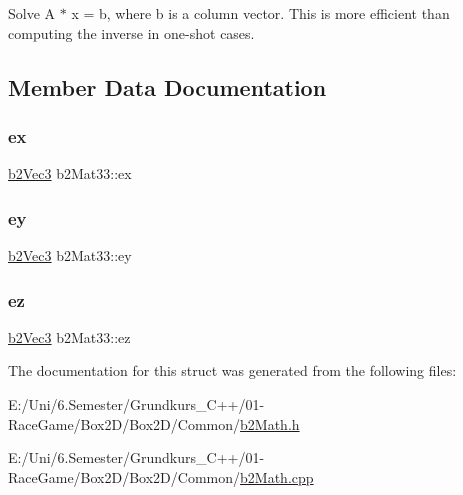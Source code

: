 Solve A $\ast$ x = b, where b is a column vector. This is more efficient than computing the inverse in one-\/shot cases. 

\subsection{Member Data Documentation}
\mbox{\label{structb2_mat33_a132f00e6550d1e19c75fb60ce1229638}} 
\subsubsection{\texorpdfstring{ex}{ex}}
{\footnotesize\ttfamily \mbox{\hyperlink{structb2_vec3}{b2\+Vec3}} b2\+Mat33\+::ex}

\mbox{\label{structb2_mat33_ababc69c718c73a04a651f7a6a981ecf4}} 
\subsubsection{\texorpdfstring{ey}{ey}}
{\footnotesize\ttfamily \mbox{\hyperlink{structb2_vec3}{b2\+Vec3}} b2\+Mat33\+::ey}

\mbox{\label{structb2_mat33_ae700fc46f679b4ef211a2517005b0557}} 
\subsubsection{\texorpdfstring{ez}{ez}}
{\footnotesize\ttfamily \mbox{\hyperlink{structb2_vec3}{b2\+Vec3}} b2\+Mat33\+::ez}



The documentation for this struct was generated from the following files\+:\begin{DoxyCompactItemize}
\item 
E\+:/\+Uni/6.\+Semester/\+Grundkurs\+\_\+\+C++/01-\/\+Race\+Game/\+Box2\+D/\+Box2\+D/\+Common/\mbox{\hyperlink{b2_math_8h}{b2\+Math.\+h}}\item 
E\+:/\+Uni/6.\+Semester/\+Grundkurs\+\_\+\+C++/01-\/\+Race\+Game/\+Box2\+D/\+Box2\+D/\+Common/\mbox{\hyperlink{b2_math_8cpp}{b2\+Math.\+cpp}}\end{DoxyCompactItemize}

